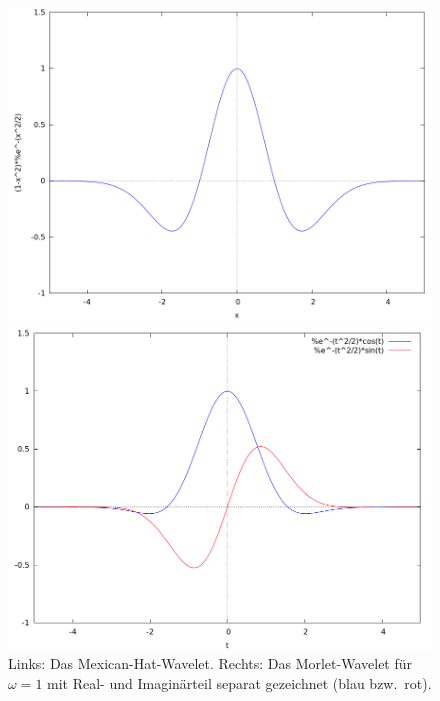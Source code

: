 \begin{example}[Wavelets]
\begin{figure}[ht]
\centering
\begin{minipage}{0.49\textwidth}
\includegraphics[width=\linewidth]{Bilder/mexican-hat}
\end{minipage}
\hfill
\begin{minipage}{0.49\textwidth}
\includegraphics[width=\linewidth]{Bilder/morlet}
\end{minipage}
\caption{Links: Das Mexican-Hat-Wavelet. Rechts: Das Morlet-Wavelet für $ \omega = 1 $ mit
  Real- und Imaginärteil separat gezeichnet (blau bzw.\ rot).}
\label{fig:wavelets}
\end{figure}
\leavevmode

\end{example}
